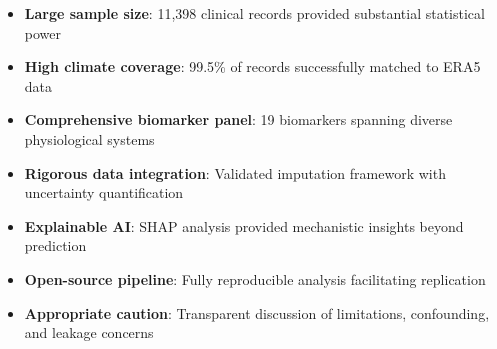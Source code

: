 \begin{itemize}
    \item \textbf{Large sample size}: 11,398 clinical records provided substantial statistical power
    \item \textbf{High climate coverage}: 99.5\% of records successfully matched to ERA5 data
    \item \textbf{Comprehensive biomarker panel}: 19 biomarkers spanning diverse physiological systems
    \item \textbf{Rigorous data integration}: Validated imputation framework with uncertainty quantification
    \item \textbf{Explainable AI}: SHAP analysis provided mechanistic insights beyond prediction
    \item \textbf{Open-source pipeline}: Fully reproducible analysis facilitating replication
    \item \textbf{Appropriate caution}: Transparent discussion of limitations, confounding, and leakage concerns
\end{itemize}
